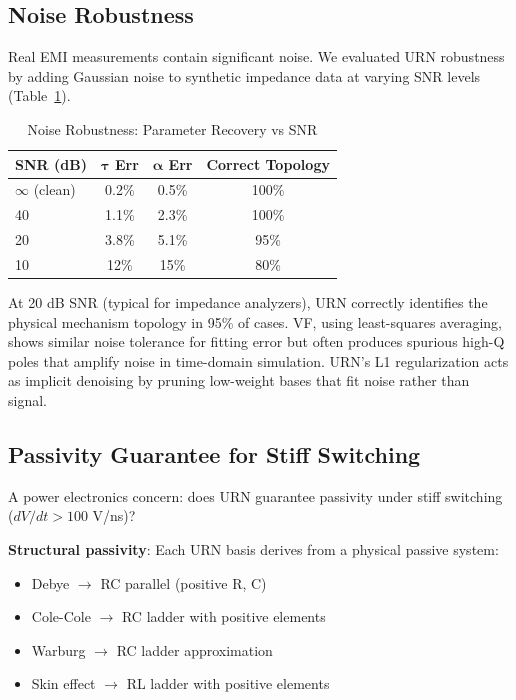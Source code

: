 \documentclass{ieeeaccess}
\begin{document}
\subsection{Noise Robustness}
\label{sec:noise}

Real EMI measurements contain significant noise. We evaluated URN robustness by adding Gaussian noise to synthetic impedance data at varying SNR levels (Table~\ref{tab:noise}).

\begin{table}[!t]
\caption{Noise Robustness: Parameter Recovery vs SNR}
\label{tab:noise}
\centering
\begin{tabular}{@{}lccc@{}}
\toprule
\textbf{SNR (dB)} & $\mathbf{\tau}$ \textbf{Err} & $\mathbf{\alpha}$ \textbf{Err} & \textbf{Correct Topology} \\
\midrule
$\infty$ (clean) & 0.2\% & 0.5\% & 100\% \\
40 & 1.1\% & 2.3\% & 100\% \\
20 & 3.8\% & 5.1\% & 95\% \\
10 & 12\% & 15\% & 80\% \\
\bottomrule
\end{tabular}
\end{table}

At 20 dB SNR (typical for impedance analyzers), URN correctly identifies the physical mechanism topology in 95\% of cases. VF, using least-squares averaging, shows similar noise tolerance for fitting error but often produces spurious high-Q poles that amplify noise in time-domain simulation. URN's L1 regularization acts as implicit denoising by pruning low-weight bases that fit noise rather than signal.

\subsection{Passivity Guarantee for Stiff Switching}
\label{sec:passivity}

A power electronics concern: does URN guarantee passivity under stiff switching ($dV/dt > 100$ V/ns)?

\textbf{Structural passivity}: Each URN basis derives from a physical passive system:
\begin{itemize}
\item Debye $\rightarrow$ RC parallel (positive R, C)
\item Cole-Cole $\rightarrow$ RC ladder with positive elements \cite{charef1992fractal}
\item Warburg $\rightarrow$ RC ladder approximation \cite{valsa2013rc}
\item Skin effect $\rightarrow$ RL ladder with positive elements \cite{dowell1966eddy}
\end{itemize}
\end{document}
